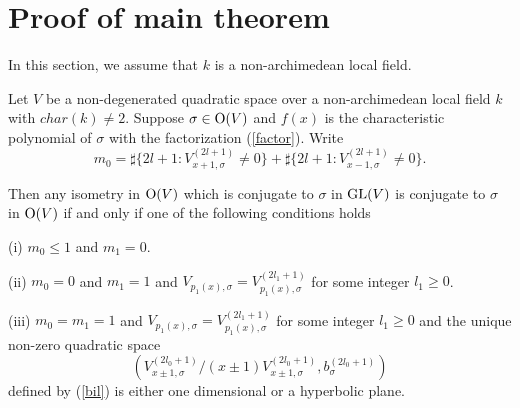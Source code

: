\documentclass[12pt]{amsart}
\begin{document}
\section{Proof of main theorem}

In this section, we assume that $k$ is a non-archimedean local field.

\begin{thm}  Let $V$ be a non-degenerated quadratic space over a non-archimedean local field $k$ with $char(k)\neq 2$. Suppose $\sigma\in {\rm O}(V)$ and $f(x)$ is the characteristic polynomial of $\sigma$ with the factorization (\ref{factor}). Write 
$$ m_0= \sharp \{ 2l+1 : V_{x+1, \sigma}^{(2l+1)} \neq 0  \} + \sharp \{ 2l+1: V_{x-1, \sigma}^{(2l+1)} \neq 0 \} . $$

Then any isometry in ${\rm O}(V)$ which is conjugate to $\sigma$ in ${\rm GL}(V)$ is conjugate to $\sigma$ in ${\rm O}(V)$ if and only if  one of the following conditions holds

(i) $m_0\leq 1$ and $m_1=0$.

(ii) $m_0=0$ and $m_1=1$ and $V_{p_1(x), \sigma}=V_{p_1(x), \sigma}^{(2l_1+1)}$ for some integer $l_1\geq 0$.   

(iii) $m_0=m_1=1$ and $V_{p_1(x), \sigma}=V_{p_1(x), \sigma}^{(2l_1+1)}$ for some integer $l_1\geq 0$ and the unique non-zero quadratic space $$(V_{x\pm 1, \sigma}^{(2l_0+1)}/(x\pm 1)V_{x\pm 1, \sigma}^{(2l_0+1)} , b_\sigma^{(2l_0+1)})$$ defined by (\ref{bil}) is either one dimensional or a hyperbolic plane.
\end{thm}
\end{document}
